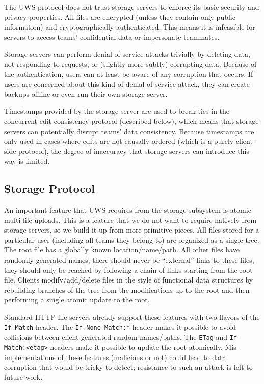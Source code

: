 \documentclass[runningheads]{llncs}
\begin{document}
The UWS protocol does not trust storage servers to enforce its basic security and privacy properties.
All files are encrypted (unless they contain only public information) and cryptographically authenticated.
This means it is infeasible for servers to access teams' confidential data or impersonate teammates.

Storage servers can perform denial of service attacks trivially by deleting data, not responding to requests, or (slightly more subtly) corrupting data.
Because of the authentication, users can at least be aware of any corruption that occurs.
If users are concerned about this kind of denial of service attack, they can create backups offline or even run their own storage server.

Timestamps provided by the storage server are used to break ties in the concurrent edit consistency protocol (described below), which means that storage servers can potentially disrupt teams' data consistency.
Because timestamps are only used in cases where edits are not causally ordered (which is a purely client-side protocol), the degree of inaccuracy that storage servers can introduce this way is limited.

\subsection{Storage Protocol}

An important feature that UWS requires from the storage subsystem is atomic multi-file uploads.
This is a feature that we do not want to require natively from storage servers, so we build it up from more primitive pieces.
All files stored for a particular user (including all teams they belong to) are organized as a single tree.
The root file has a globally known location{\slash}name{\slash}path.
All other files have randomly generated names; there should never be ``external'' links to these files, they should only be reached by following a chain of links starting from the root file.
Clients modify{\slash}add{\slash}delete files in the style of functional data structures by rebuilding branches of the tree from the modifications up to the root and then performing a single atomic update to the root.

Standard HTTP file servers already support these features with two flavors of the \texttt{If-Match} header.
The \texttt{If-None-Match:*} header makes it possible to avoid collisions between client-generated random names{\slash}paths.
The \texttt{ETag} and \texttt{If-Match:<etag>} headers make it possible to update the root atomically.
Mis-implementations of these features (malicious or not) could lead to data corruption that would be tricky to detect; resistance to such an attack is left to future work.
\end{document}
